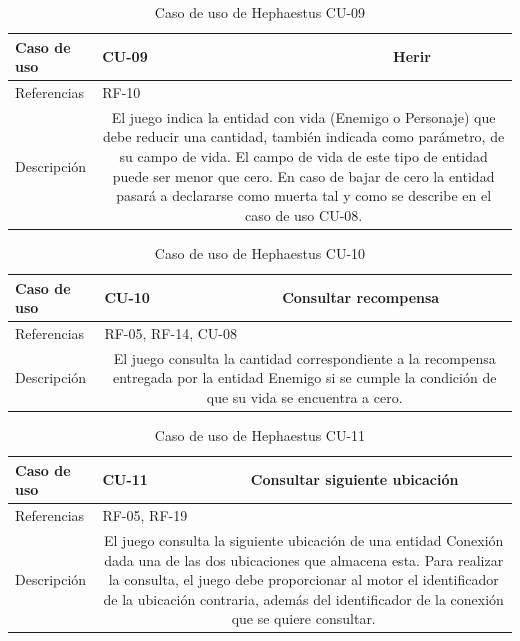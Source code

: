 \begin{table}[H]
	\centering
	\small
	\begin{tabularx}{\linewidth}{|l|cc|}
		\hline
		{\cellcolor[HTML]{C0C0C0} Caso de uso} & \multicolumn{1}{l|}{CU-09} & Herir \\ \hline
		{\cellcolor[HTML]{C0C0C0} Referencias} & \multicolumn{2}{l|}{RF-10} \\ \hline
		{\cellcolor[HTML]{C0C0C0} Descripción} & \multicolumn{2}{X|}{El juego indica la entidad con vida (Enemigo o Personaje) que debe reducir una cantidad, también indicada como parámetro, de su campo de vida. El campo de vida de este tipo de entidad puede ser menor que cero. En caso de bajar de cero la entidad pasará a declararse como muerta tal y como se describe en el caso de uso CU-08.} \\ \hline
	\end{tabularx}
	
	\vspace{0.5cm}
	\caption{Caso de uso de Hephaestus CU-09}
	\label{tab:hephaestus-cu-09}
\end{table}

\begin{table}[H]
	\centering
	\small
	\begin{tabularx}{\linewidth}{|l|cc|}
		\hline
		{\cellcolor[HTML]{C0C0C0} Caso de uso} & \multicolumn{1}{l|}{CU-10} & Consultar recompensa \\ \hline
		{\cellcolor[HTML]{C0C0C0} Referencias} & \multicolumn{2}{l|}{RF-05, RF-14, CU-08} \\ \hline
		{\cellcolor[HTML]{C0C0C0} Descripción} & \multicolumn{2}{X|}{El juego consulta la cantidad correspondiente a la recompensa entregada por la entidad Enemigo si se cumple la condición de que su vida se encuentra a cero.} \\ \hline
	\end{tabularx}
	
	\vspace{0.5cm}
	\caption{Caso de uso de Hephaestus CU-10}
	\label{tab:hephaestus-cu-10}
\end{table}

\begin{table}[H]
	\centering
	\small
	\begin{tabularx}{\linewidth}{|l|cc|}
		\hline
		{\cellcolor[HTML]{C0C0C0} Caso de uso} & \multicolumn{1}{l|}{CU-11} & Consultar siguiente ubicación \\ \hline
		{\cellcolor[HTML]{C0C0C0} Referencias} & \multicolumn{2}{l|}{RF-05, RF-19} \\ \hline
		{\cellcolor[HTML]{C0C0C0} Descripción} & \multicolumn{2}{X|}{El juego consulta la siguiente ubicación de una entidad Conexión dada una de las dos ubicaciones que almacena esta. Para realizar la consulta, el juego debe proporcionar al motor el identificador de la ubicación contraria, además del identificador de la conexión que se quiere consultar.} \\ \hline
	\end{tabularx}
	
	\vspace{0.5cm}
	\caption{Caso de uso de Hephaestus CU-11}
	\label{tab:hephaestus-cu-11}
\end{table}

